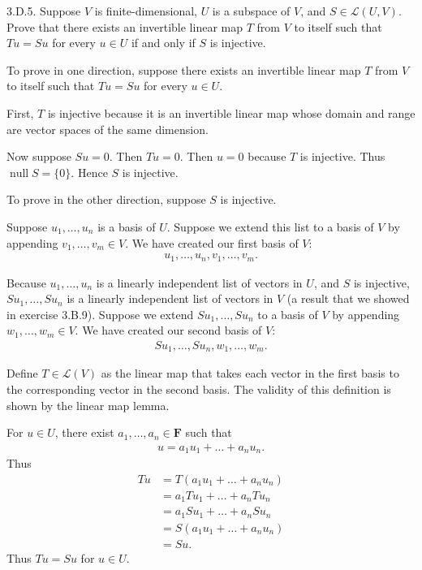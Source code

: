 \documentclass[a5paper]{article}
\begin{document}
\newcommand   \C           {\mathbf{C}}
\newcommand   \R           {\mathbf{R}}
\renewcommand \L           {\mathcal{L}}
\newcommand   \F           {\mathbf{F}}
\renewcommand \P           {\mathcal{P}}
\newcommand   \M           {\mathcal{M}}
\newcommand   \op          {\operatorname}

    3.D.5.
    Suppose $V$ is finite-dimensional, $U$ is a subspace of $V$, and $S \in \L(U,V)$.
    Prove that there exists an invertible linear map $T$ from $V$ to itself such that $Tu = Su$ for every $u \in U$ if and only if $S$ is injective.

    To prove in one direction, suppose there exists an invertible linear map $T$ from $V$ to itself such that $Tu = Su$ for every $u \in U$.

    First, $T$ is injective because it is an invertible linear map whose domain and range are vector spaces of the same dimension.

    Now suppose $Su = 0$.
    Then $Tu = 0$.
    Then $u = 0$ because $T$ is injective.
    Thus $\op{null}S = \{0\}$.
    Hence $S$ is injective.


    To prove in the other direction, suppose $S$ is injective.

    Suppose $u_1,\dots,u_n$ is a basis of $U$.
    Suppose we extend this list to a basis of $V$ by appending $v_1,\dots,v_m \in V$.
    We have created our first basis of $V$:
\begin{align*}
        u_1,\dots,u_n, v_1,\dots,v_m .
\end{align*}

    Because $u_1,\dots,u_n$ is a linearly independent list of vectors in $U$, and $S$ is injective, $Su_1,\dots,Su_n$ is a linearly independent list of vectors in $V$ (a result that we showed in exercise 3.B.9).
    Suppose we extend $Su_1,\dots,Su_n$ to a basis of $V$ by appending $w_1,\dots,w_m \in V$.
    We have created our second basis of $V$:
\begin{align*}
        Su_1,\dots,Su_n, w_1,\dots,w_m .
\end{align*}

    Define $T \in \L(V)$ as the linear map that takes each vector in the first basis to the corresponding vector in the second basis.
    The validity of this definition is shown by the linear map lemma.

    For $u \in U$, there exist $a_1,\dots,a_n \in \F$ such that
\begin{align*}
        u = a_1u_1+\dots+a_nu_n .
\end{align*}
    Thus
\begin{align*}
        Tu &= T(a_1u_1+\dots+a_nu_n) \\
           &= a_1Tu_1+\dots+a_nTu_n \\
           &= a_1Su_1+\dots+a_nSu_n \\
           &= S(a_1u_1+\dots+a_nu_n) \\
           &= Su .
\end{align*}
    Thus $Tu = Su$ for $u \in U$.
\end{document}
